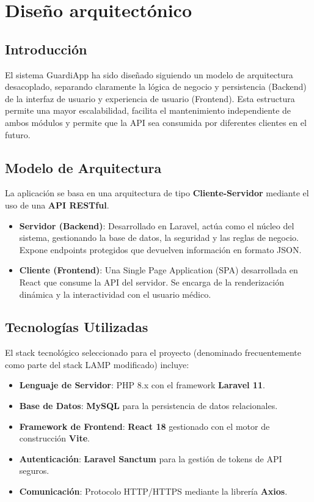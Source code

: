 \chapter{Diseño arquitectónico} \label{cap:diseno-arquitectonico}

\section{Introducción}
El sistema GuardiApp ha sido diseñado siguiendo un modelo de arquitectura desacoplado, separando claramente la lógica de negocio y persistencia (Backend) de la interfaz de usuario y experiencia de usuario (Frontend). Esta estructura permite una mayor escalabilidad, facilita el mantenimiento independiente de ambos módulos y permite que la API sea consumida por diferentes clientes en el futuro.

\section{Modelo de Arquitectura}
La aplicación se basa en una arquitectura de tipo \textbf{Cliente-Servidor} mediante el uso de una \textbf{API RESTful}. 

\begin{itemize}
    \item \textbf{Servidor (Backend)}: Desarrollado en Laravel, actúa como el núcleo del sistema, gestionando la base de datos, la seguridad y las reglas de negocio. Expone endpoints protegidos que devuelven información en formato JSON.
    \item \textbf{Cliente (Frontend)}: Una Single Page Application (SPA) desarrollada en React que consume la API del servidor. Se encarga de la renderización dinámica y la interactividad con el usuario médico.
\end{itemize}

\section{Tecnologías Utilizadas}
El stack tecnológico seleccionado para el proyecto (denominado frecuentemente como parte del stack LAMP modificado) incluye:

\begin{itemize}
    \item \textbf{Lenguaje de Servidor}: PHP 8.x con el framework \textbf{Laravel 11}.
    \item \textbf{Base de Datos}: \textbf{MySQL} para la persistencia de datos relacionales.
    \item \textbf{Framework de Frontend}: \textbf{React 18} gestionado con el motor de construcción \textbf{Vite}.
    \item \textbf{Autenticación}: \textbf{Laravel Sanctum} para la gestión de tokens de API seguros.
    \item \textbf{Comunicación}: Protocolo HTTP/HTTPS mediante la librería \textbf{Axios}.
\end{itemize}

